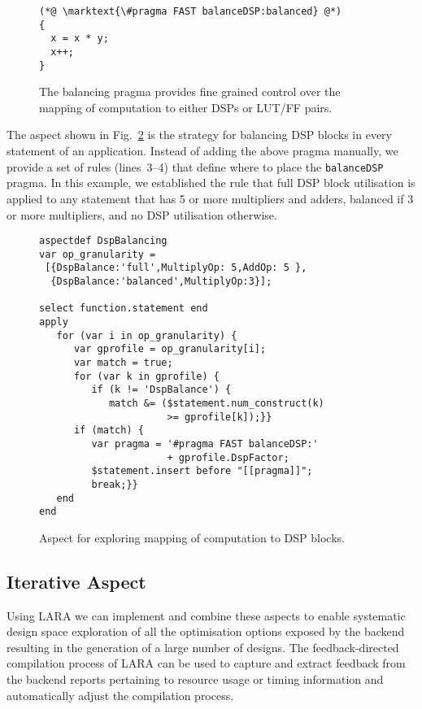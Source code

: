 \lstset{style=MaxC}
\begin{figure}[!h]
\begin{lstlisting}
(*@ \marktext{\#pragma FAST balanceDSP:balanced} @*)
{
  x = x * y;
  x++;
}
\end{lstlisting}
\caption{The \MAXC{} balancing pragma provides fine grained control
  over the mapping of computation to either DSPs or LUT/FF pairs.}
\label{fig:aspect-balance}
\end{figure}

The aspect shown in Fig.~\ref{fig:aspect-DSP} is the strategy for
balancing DSP blocks in every statement of an application. Instead of
adding the above pragma manually, we provide a set of rules
(lines~3--4) that define where to place the \texttt{balanceDSP}
pragma. In this example, we established the rule that full DSP block
utilisation is applied to any statement that has 5 or more
multipliers and adders, balanced if 3 or more multipliers, and no DSP
utilisation otherwise.

\lstset{style=lara}
\begin{figure}[!h]
  \centering
  \begin{lstlisting}
aspectdef DspBalancing
var op_granularity =
 [{DspBalance:'full',MultiplyOp: 5,AddOp: 5 },
  {DspBalance:'balanced',MultiplyOp:3}];

select function.statement end
apply
   for (var i in op_granularity) {
      var gprofile = op_granularity[i];
      var match = true;
      for (var k in gprofile) {
         if (k != 'DspBalance') {
            match &= ($statement.num_construct(k)
                      >= gprofile[k]);}}
      if (match) {
         var pragma = '#pragma FAST balanceDSP:'
                      + gprofile.DspFactor;
         $statement.insert before "[[pragma]]";
         break;}}
   end
end
  \end{lstlisting}
  \caption{Aspect for exploring mapping of computation to DSP blocks.}
  \label{fig:aspect-DSP}
\end{figure}

\subsection{Iterative Aspect}
\label{sect:asp_it}
Using LARA we can implement and combine these aspects to enable
systematic design space exploration of all the optimisation options
exposed by the \MAXC{} backend resulting in the generation of a large
number of designs. The feedback-directed compilation process of LARA
can be used to capture and extract feedback from the backend reports
pertaining to resource usage or timing information and automatically
adjust the compilation process.


